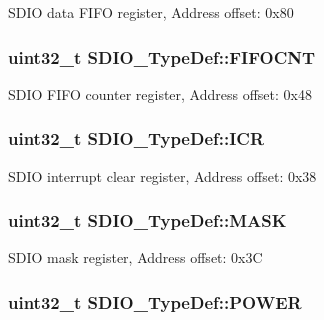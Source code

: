 S\-D\-I\-O data F\-I\-F\-O register, Address offset\-: 0x80 \hypertarget{struct_s_d_i_o___type_def_ae30d52b6556f5d17db8e5cfd2641e7b4}{
\subsubsection[{F\-I\-F\-O\-C\-N\-T}]{ uint32\-\_\-t S\-D\-I\-O\-\_\-\-Type\-Def\-::\-F\-I\-F\-O\-C\-N\-T}}\label{struct_s_d_i_o___type_def_ae30d52b6556f5d17db8e5cfd2641e7b4}
S\-D\-I\-O F\-I\-F\-O counter register, Address offset\-: 0x48 \hypertarget{struct_s_d_i_o___type_def_ae3c052b85cc438d2b3069f99620e5139}{
\subsubsection[{I\-C\-R}]{ uint32\-\_\-t S\-D\-I\-O\-\_\-\-Type\-Def\-::\-I\-C\-R}}\label{struct_s_d_i_o___type_def_ae3c052b85cc438d2b3069f99620e5139}
S\-D\-I\-O interrupt clear register, Address offset\-: 0x38 \hypertarget{struct_s_d_i_o___type_def_a9a08e405ab985c60ff9031025ab37d31}{
\subsubsection[{M\-A\-S\-K}]{ uint32\-\_\-t S\-D\-I\-O\-\_\-\-Type\-Def\-::\-M\-A\-S\-K}}\label{struct_s_d_i_o___type_def_a9a08e405ab985c60ff9031025ab37d31}
S\-D\-I\-O mask register, Address offset\-: 0x3\-C \hypertarget{struct_s_d_i_o___type_def_a7c156bc55f6d970a846a459d57a9e940}{
\subsubsection[{P\-O\-W\-E\-R}]{ uint32\-\_\-t S\-D\-I\-O\-\_\-\-Type\-Def\-::\-P\-O\-W\-E\-R}}\label{struct_s_d_i_o___type_def_a7c156bc55f6d970a846a459d57a9e940}
